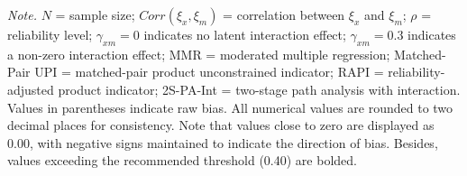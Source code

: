 \documentclass[
  man]{apa6}
\newenvironment{lltable}{\begin{landscape}\centering\begin{ThreePartTable}}{\end{ThreePartTable}\end{landscape}}
\begin{document}
\begin{lltable}

\begin{TableNotes}[para]
\normalsize{\textit{Note.} $\textit{N}$ = sample size; $Corr(\xi_{x}, \xi_{m})$ = correlation between $\xi_{x}$ and $\xi_{m}$; $\rho$ = reliability level; $\gamma_{xm} = 0$ indicates no latent interaction effect; $\gamma_{xm} = 0.3$ indicates a non-zero interaction effect; MMR = moderated multiple regression; Matched-Pair UPI = matched-pair product unconstrained indicator; RAPI = reliability-adjusted product indicator; 2S-PA-Int = two-stage path analysis with interaction. Values in parentheses indicate raw bias. All numerical values are rounded to two decimal places for consistency. Note that values close to zero are displayed as 0.00, with negative signs maintained to indicate the direction of bias. Besides, values exceeding the recommended threshold (0.40) are bolded.}
\end{TableNotes}

\tiny{

}
\end{lltable}
\end{document}
